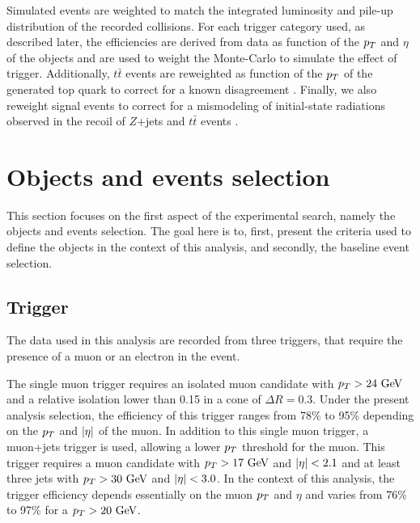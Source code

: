     Simulated events are weighted to match the integrated luminosity and pile-up distribution
    of the recorded collisions. For each trigger category used, as described later, the
    efficiencies are derived from data as function of the $p_T$ and $\eta$ of the objects
    and are used to weight the Monte-Carlo to simulate the effect of trigger. Additionally,
    $t\bar{t}$ events are reweighted as function of the $p_T$ of the generated top quark
    to correct for a known disagreement \cite{topPtReweighting}. Finally, we also reweight
    signal events to correct for a mismodeling of initial-state radiations observed in the
    recoil of $Z$+jets and $t\bar{t}$ events \cite{ISRmodelingDominick}.

    \section{Objects and events selection \label{sec:analysis_objectAndEventSelection}}

    This section focuses on the first aspect of the experimental search, namely the objects
    and events selection. The goal here is to, first, present the criteria used to define the
    objects in the context of this analysis, and secondly, the baseline event selection.

        \subsection{Trigger}

    The data used in this analysis are recorded from three triggers, that require the
    presence of a muon or an electron in the event.

    The single muon trigger requires an isolated muon candidate with $p_T > 24~\text{GeV}$
    and a relative isolation lower than 0.15 in a cone of $\Delta R = 0.3$. Under the present
    analysis selection, the efficiency of this trigger ranges from 78\% to 95\% depending
    on the $p_T$ and $\left| \eta \right|$ of the muon. In addition to this single muon trigger, a
    muon+jets trigger is used, allowing a lower $p_T$ threshold for the muon. This trigger
    requires a muon candidate with $p_T > 17~\text{GeV}$ and $\left| \eta \right| < 2.1$ and at least three
    jets with $p_T > 30~\text{GeV}$ and $\left| \eta \right| < 3.0$. In the context of this analysis, the
    trigger efficiency depends essentially on the muon $p_T$ and $\eta$ and
    varies from 76\% to 97\% for a $p_T > 20~\text{GeV}$.

